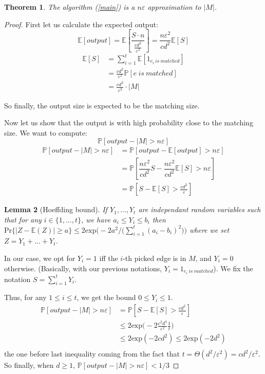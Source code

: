 \documentclass{jams-l}
\newtheorem{theorem}{Theorem}[section]
\newtheorem{lemma}[theorem]{Lemma}
\theoremstyle{definition}
\theoremstyle{remark}
\numberwithin{equation}{section}
\begin{document}
\begin{theorem}
The algorithm (\ref{main}) is a $n \varepsilon$ approximation to $|M|$.
\end{theorem}
\begin{proof}
First let us calculate the expected output:
\[
\mathbb{E}[output] = \mathbb{E}\left [\dfrac{S \cdot n}{\frac{cd^2}{\varepsilon^2}} \right ]
=\dfrac{n\varepsilon^2}{cd^2}\mathbb{E}[S]
\]
\begin{align*}
  \mathbb{E}[S]&= \sum_{i=1}^t \mathbb{E}[1_{e_i~is~matched}]\\
   &= \frac{cd^2}{\varepsilon^2} \mathbb{P}[e~is~matched] \\
   &=\frac{cd^2}{\varepsilon^2} \cdot |M|
\end{align*}

So finally, the output size is expected to be the matching size.

Now let us show that the output is with high probability close to the matching size.
We want to compute:
\[
\mathbb{P}[output - |M| > n\varepsilon]
\]
\begin{align*}
\mathbb{P}[output - |M| > n\varepsilon] &= \mathbb{P}[output - \mathbb{E}[output] > n\varepsilon]\\
	&=\mathbb{P}[\dfrac{n\varepsilon^2}{cd^2}S - \dfrac{n\varepsilon^2}{cd^2}\mathbb{E}[S] 
> n\varepsilon]\\
	&=\mathbb{P}[S - \mathbb{E}[S] >  \frac{cd^2}{\varepsilon}]
\end{align*}


\begin{lemma}[Hoeffding bound] If $Y_1,\dots,Y_t$ are independant random variables such that for any $i \in\{1,\dots,t\}$, we have $a_i \leq Y_i \leq b_i$ then $\mathrm{Pr}\{|Z - \mathbb{E}(Z)| \geq a \} \leq 2 \mathrm{exp}\Big(-2a^2/\big(\sum_{i=1}^t(a_i-b_i)^2\big)\Big)$ where we set $Z = Y_1+\dots+Y_t$.
\end{lemma}

In our case, we opt for $Y_i=1$ iff the $i$-th picked edge is in $M$, 
and $Y_i = 0$ otherwise. (Basically, with our previous notations, $Y_i=1_{e_i~is~matched}$).
We fix the notation $S = \sum_{i=1}^t Y_i$. 

Thus, for any $1 \leq i \leq t$, we get the bound $0 \leq Y_i \leq 1$.
\begin{align*}
\mathbb{P}[output - |M| > n\varepsilon] &= \mathbb{P}[S - \mathbb{E}[S] >  \frac{cd^2}{\varepsilon}]\\
	&\leq 2 \mathrm{exp}\Big(-2 \frac{c^2d^4}{\varepsilon^2}\frac{1}{t}\Big) \\
	&\leq 2 \mathrm{exp}(-2 cd^2) \leq 2 \mathrm{exp}(-2 d^2)\\
\end{align*}
the one before last inequality coming from the fact that $t = \Theta(d^2/\varepsilon^2) = cd^2/\varepsilon^2$.\\
So finally, when $d \geq 1$, $\mathbb{P}[output - |M| > n\varepsilon]<1/3$


\end{proof}
\end{document}
